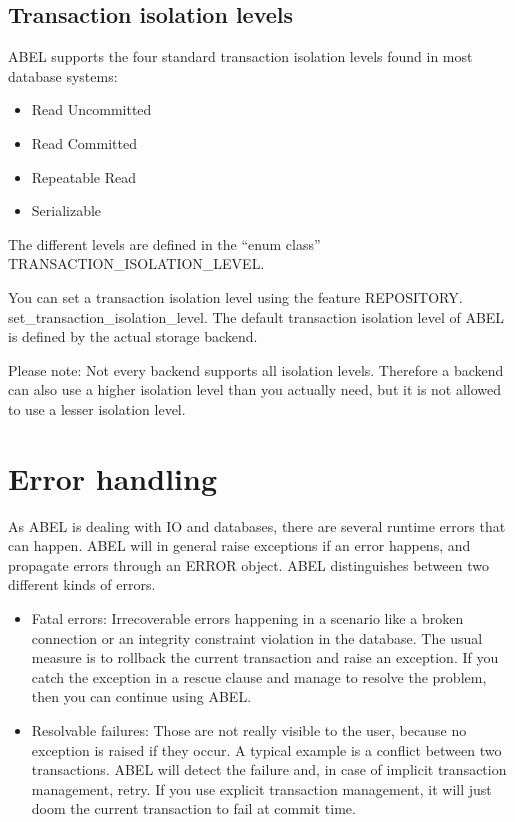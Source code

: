 \subsection{Transaction isolation levels}

ABEL supports the four standard transaction isolation levels found in most database systems:
\begin{itemize}
 \item Read Uncommitted
 \item Read Committed
 \item Repeatable Read
 \item Serializable
\end{itemize}

The different levels are defined in the ``enum class'' TRANSACTION\_\-ISOLATION\_LEVEL.

You can set a transaction isolation level using the feature REPOSITORY. set\_\-transaction\_isolation\_level.
The default transaction isolation level of ABEL is defined by the actual storage backend.

Please note: Not every backend supports all isolation levels.
Therefore a backend can also use a higher isolation level than you actually need, but it is not allowed to use a lesser isolation level.



\section{Error handling}

As ABEL is dealing with IO and databases, there are several runtime errors that can happen. 
ABEL will in general raise exceptions if an error happens, and propagate errors through an ERROR object.
ABEL distinguishes between two different kinds of errors.

\begin{itemize}

\item Fatal errors: Irrecoverable errors happening in a scenario like a broken connection or an integrity constraint violation in the database.
The usual measure is to rollback the current transaction and raise an exception. 
If you catch the exception in a rescue clause and manage to resolve the problem, then you can continue using ABEL.

\item Resolvable failures: Those are not really visible to the user, because no exception is raised if they occur.
A typical example is a conflict between two transactions.
ABEL will detect the failure and, in case of implicit transaction management, retry.
If you use explicit transaction management, it will just doom the current transaction to fail at commit time.
\end{itemize}

